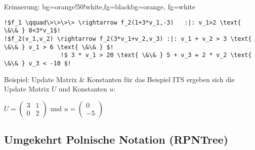 \begin{frame}[fragile]
	\begin{variableblock}{Erinnerung: \its}{bg=orange!50!white,fg=black}{bg=orange, fg=white}
		\begin{lstlisting}[linewidth=10.5cm, escapechar = !]
!$f_1 \qquad\>\>\>\> \rightarrow f_2(1+3*v_1,-3)   :|: v_1>2 \text{ \&\& } 8<3*v_1$!
!$f_2(v_1,v_2) \rightarrow f_2(3*v_1+v_2,v_3) :|: v_1 + v_2 > 3 \text{ \&\& } v_1 > 6 \text{ \&\& } $!
				!$ 3 * v_1 > 20 \text{ \&\& } 5 + v_3 = 2 * v_2 \text{ \&\& } v_3 < -10 $!
		\end{lstlisting}
	\end{variableblock}
		\begin{exampleblock}{Beispiel: Update Matrix \& Konstanten}
			f\"ur das Beispiel ITS ergeben sich die Update Matrix $U$ und Konstanten $u$:\newline
			\begin{center}
				\vspace{-2em}
				$U = \begin{pmatrix} 3 & 1 \\ 0 & 2 \end{pmatrix}$ und $u = \begin{pmatrix} 0 \\ -5 \end{pmatrix}$
			\end{center}		
		\end{exampleblock}
\end{frame}

\subsection{Umgekehrt Polnische Notation (RPNTree)}

